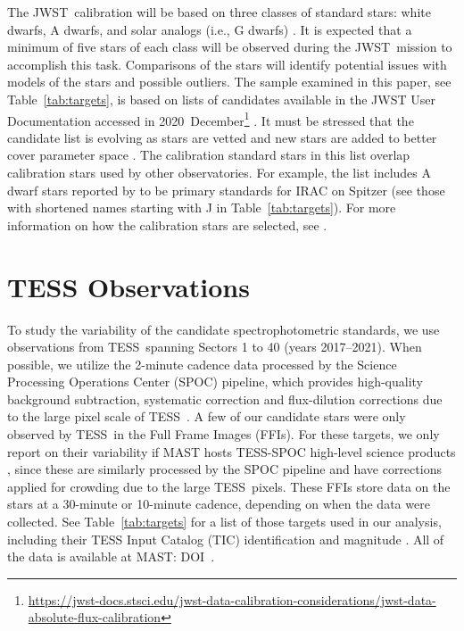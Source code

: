 \documentclass[twocolumn]{aastex631}
\newcommand{\webb}{JWST}
\newcommand{\jwst}{JWST}
\newcommand{\tess}{TESS}
\begin{document}
The \webb\ calibration will be based on three classes of standard stars:  white dwarfs, A dwarfs, and solar analogs (i.e., G dwarfs) \citep{Gordon2022inprep}.  It is expected that a minimum of five stars of each class will be observed during the \jwst\ mission to accomplish this task.  Comparisons of the stars will identify potential issues with models of the stars and possible outliers.  The sample examined in this paper, see Table~\ref{tab:targets}, is based on lists of candidates available in the JWST User Documentation accessed in 2020~December\footnote{\url{https://jwst-docs.stsci.edu/jwst-data-calibration-considerations/jwst-data-absolute-flux-calibration}} \citep{jdox}.  It must be stressed that the candidate list is evolving as stars are vetted and new stars are added to better cover parameter space \citep{Gordon2022inprep}.  The calibration standard stars in this list overlap calibration stars used by other observatories. For example, the list includes A dwarf stars reported by \citet{Reach2005} to be primary standards for IRAC on Spitzer (see those with shortened names starting with J in Table~\ref{tab:targets}). For more information on how the calibration stars are selected, see \citet{Gordon2022inprep}.



\section{TESS Observations}
\label{sec:obs}

To study the variability of the candidate spectrophotometric standards, we use observations from \tess\ spanning Sectors 1 to 40 (years 2017--2021). When possible, we utilize the 2-minute cadence data processed by the Science Processing Operations Center (SPOC) pipeline, which provides high-quality background subtraction, systematic correction and flux-dilution corrections due to the large pixel scale of \tess\ \citep{kdph2020ksciApertures,kdph2020ksciCal,kdph2020ksciPA,kdph2020PDC}. A few of our candidate stars were only observed by \tess\ in the Full Frame Images (FFIs). For these targets, we only report on their variability if MAST hosts \tess-SPOC high-level science products \citep{Caldwell2020spoc}, since these are similarly processed by the SPOC pipeline and have corrections applied for crowding due to the large \tess\ pixels. These FFIs store data on the stars at a 30-minute or 10-minute cadence, depending on when the data were collected. See Table~\ref{tab:targets} for a list of those targets used in our analysis, including their TESS Input Catalog (TIC) identification and magnitude \citep{Stassun2018TIC}. All of the data is available at MAST: DOI\, .
\end{document}
